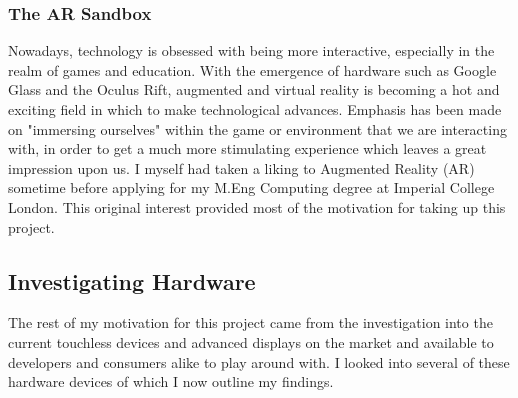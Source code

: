 \documentclass[11pt]{report}
\begin{document}
\subsubsection*{The AR Sandbox}




Nowadays, technology is obsessed with being more interactive, especially in 
the realm of games and education. With the emergence of hardware such as
Google Glass and the Oculus Rift, augmented and virtual reality is becoming
a hot and exciting field in which to make technological advances. Emphasis
has been made on "immersing ourselves" within the game or environment that
we are interacting with, in order to get a much more stimulating experience
which leaves a great impression upon us. I myself had taken a liking to 
Augmented Reality (AR) sometime before applying for my M.Eng Computing degree
at Imperial College London. This original interest provided most of the 
motivation for taking up this project.

\subsection*{Investigating Hardware}
The rest of my motivation for this project came from the investigation into 
the current touchless devices and advanced displays on the market and 
available to developers and consumers alike to play around with. I looked 
into several of these hardware devices of which I now outline my findings.
 
\end{document}
